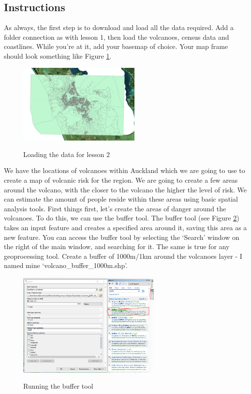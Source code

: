 \documentclass{article}
\begin{document}
\subsection{Instructions}
As always, the first step is to download and load all the data required. Add a folder connection as with lesson 1, then load the volcanoes, census data and coastlines. While you're at it, add your basemap of choice. Your map frame should look something like Figure \ref{2_rawdata}.

\begin{figure}[h]
  \centering
  \caption{Loading the data for lesson 2}
  \includegraphics[width=230px]{images/part2/rawdata.PNG}
  \label{2_rawdata}
\end{figure}
\pagebreak

We have the locations of volcanoes within Auckland which we are going to use to create a map of volcanic risk for the region. We are going to create a few areas around the volcano, with the closer to the volcano the higher the level of risk. We can estimate the amount of people reside within these areas using basic spatial analysis tools. First things first, let's create the areas of danger around the volcanoes. To do this, we can use the buffer tool. The buffer tool (see Figure \ref{2_volcanobuffer}) takes an input feature and creates a specified area around it, saving this area as a new feature. You can access the buffer tool by selecting the `Search' window on the right of the main window, and searching for it. The same is true for any geoprocessing tool. Create a buffer of 1000m/1km around the volcanoes layer - I named mine `volcano\_buffer\_1000m.shp'.

\begin{figure}[h]
  \centering
  \caption{Running the buffer tool}
  \includegraphics[width=270px]{images/part2/volcano_buffer.PNG}
  \label{2_volcanobuffer}
\end{figure}
\end{document}
